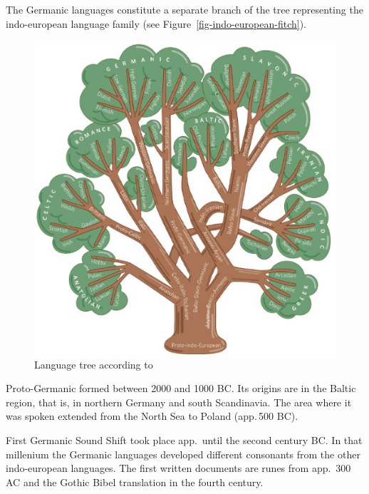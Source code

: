 The Germanic languages constitute a separate branch of the tree representing the indo-european
language family (see Figure~\vref{fig-indo-european-fitch}). 
\begin{figure}
\includegraphics[width=\textwidth]{Pictures/indoeuropaeisch}
\caption{\label{fig-indo-european-fitch}Language tree according to \citet[]{Fitch2007a-u}}
\end{figure}
Proto-Germanic formed between 2000 and
1000 BC. Its origins are in the Baltic region, that is, in northern Germany and south
Scandinavia. The area where it was spoken extended from the North Sea to Poland (app.\,500 BC).


First Germanic Sound Shift took place app.\ until the second century BC. In that millenium the
Germanic languages developed different consonants from the other indo-european languages. The first
written documents are runes from app.\ 300 AC and the Gothic Bibel translation in the fourth century.

